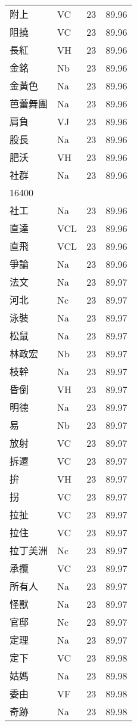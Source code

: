 \documentclass[twocolumn]{book}
\begin{document}
\begin{supertabular}{llrr}
附上 & VC & 23 &  89.96\\
阻撓 & VC & 23 &  89.96\\
長紅 & VH & 23 &  89.96\\
金銘 & Nb & 23 &  89.96\\
金黃色 & Na & 23 &  89.96\\
芭蕾舞團 & Na & 23 &  89.96\\
肩負 & VJ & 23 &  89.96\\
股長 & Na & 23 &  89.96\\
肥沃 & VH & 23 &  89.96\\
社群 & Na & 23 &  89.96\\
16400\\
社工 & Na & 23 &  89.96\\
直達 & VCL & 23 &  89.96\\
直飛 & VCL & 23 &  89.96\\
爭論 & Na & 23 &  89.96\\
法文 & Na & 23 &  89.97\\
河北 & Nc & 23 &  89.97\\
泳裝 & Na & 23 &  89.97\\
松鼠 & Na & 23 &  89.97\\
林政宏 & Nb & 23 &  89.97\\
枝幹 & Na & 23 &  89.97\\
昏倒 & VH & 23 &  89.97\\
明德 & Na & 23 &  89.97\\
易 & Nb & 23 &  89.97\\
放射 & VC & 23 &  89.97\\
拆遷 & VC & 23 &  89.97\\
拚 & VH & 23 &  89.97\\
拐 & VC & 23 &  89.97\\
拉扯 & VC & 23 &  89.97\\
拉住 & VC & 23 &  89.97\\
拉丁美洲 & Nc & 23 &  89.97\\
承攬 & VC & 23 &  89.97\\
所有人 & Na & 23 &  89.97\\
怪獸 & Na & 23 &  89.97\\
官邸 & Nc & 23 &  89.97\\
定理 & Na & 23 &  89.97\\
定下 & VC & 23 &  89.98\\
姑媽 & Na & 23 &  89.98\\
委由 & VF & 23 &  89.98\\
奇跡 & Na & 23 &  89.98\\

\end{supertabular}
\end{document}
